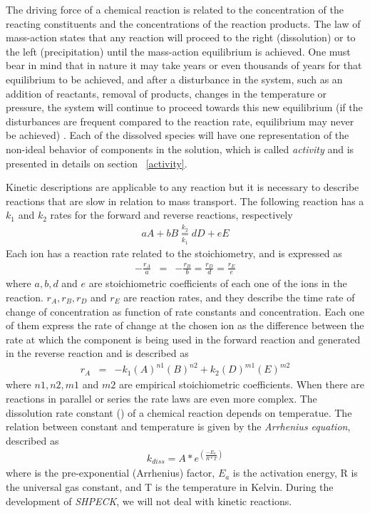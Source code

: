 The driving force of a chemical reaction is related to the concentration of the reacting constituents and the concentrations of the reaction products. The law of mass-action states that any reaction will proceed to the right (dissolution) or to the left (precipitation) until the mass-action equilibrium is achieved. One must bear in mind that in nature it may take years or even thousands of years for that equilibrium to be achieved, and after a disturbance in the system, such as an addition of reactants, removal of products, changes in the temperature or pressure, the system will continue to proceed towards this new equilibrium (if the disturbances are frequent compared to the reaction rate, equilibrium may never be achieved) \cite{Freeze:79}. Each of the dissolved species will have one representation of the non-ideal behavior of components in the solution, which is called \emph{activity} and is presented in details on section ~\ref{activity}.

Kinetic descriptions are applicable to any reaction but it is necessary to describe  reactions that are slow in relation to mass transport.  The following reaction has a $k_1$ and $k_2$ rates for the forward and reverse reactions, respectively 
\begin{eqnarray}
aA + bB \underset{k_1}{\overset{k_2}{=}} dD + eE 
\end{eqnarray}
Each ion has a reaction rate related to the stoichiometry, and is expressed as
\begin{eqnarray}
-\frac{r_A}{a} &=& -\frac{r_B}{b} = \frac{r_D}{d} = \frac{r_E}{e}
\end{eqnarray}
where $a, b, d$ and $e$ are stoichiometric coefficients of each one of the ions in the reaction. $r_A, r_B, r_D$ and $r_E$ are reaction rates, and they describe the time rate of change of concentration as function of rate constants and concentration. Each one of them express the rate of change at the chosen ion as the difference between the rate at which the component is being used in the forward reaction and generated in the reverse reaction and is described as
\begin{eqnarray}
r_A &=& - k_1 (A)^{n1}(B)^{n2} + k_2 (D)^{m1}(E)^{m2}
\end{eqnarray}
where $n1, n2, m1$ and $m2$ are empirical stoichiometric coefficients. When there are reactions in parallel or series the rate laws are even more complex.
The dissolution rate constant () of a chemical reaction depends on temperatue. The relation between constant and temperature is given by the \emph{Arrhenius equation}, described as
\begin{eqnarray}
k_{diss} = A * e^{(\frac{-E_a}{R*T})}
\end{eqnarray}
where  is the pre-exponential (Arrhenius) factor, $E_a$ is the activation energy, R is the universal gas constant, and T is the temperature in Kelvin.
During the development of \emph{SHPECK}, we will not deal with kinetic reactions.

